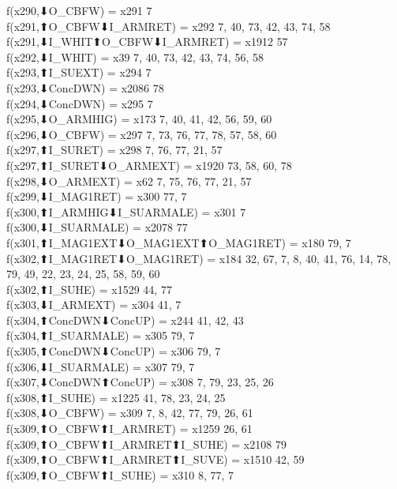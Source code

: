 f(x290,⬇O_CBFW) = x291 {7} \\
f(x291,⬆O_CBFW⬇I_ARMRET) = x292 {7, 40, 73, 42, 43, 74, 58} \\
f(x291,⬇I_WHIT⬆O_CBFW⬇I_ARMRET) = x1912 {57} \\
f(x292,⬇I_WHIT) = x39 {7, 40, 73, 42, 43, 74, 56, 58} \\
f(x293,⬆I_SUEXT) = x294 {7} \\
f(x293,⬇ConcDWN) = x2086 {78} \\
f(x294,⬇ConcDWN) = x295 {7} \\
f(x295,⬇O_ARMHIG) = x173 {7, 40, 41, 42, 56, 59, 60} \\
f(x296,⬇O_CBFW) = x297 {7, 73, 76, 77, 78, 57, 58, 60} \\
f(x297,⬆I_SURET) = x298 {7, 76, 77, 21, 57} \\
f(x297,⬆I_SURET⬇O_ARMEXT) = x1920 {73, 58, 60, 78} \\
f(x298,⬇O_ARMEXT) = x62 {7, 75, 76, 77, 21, 57} \\
f(x299,⬇I_MAG1RET) = x300 {77, 7} \\
f(x300,⬆I_ARMHIG⬇I_SUARMALE) = x301 {7} \\
f(x300,⬇I_SUARMALE) = x2078 {77} \\
f(x301,⬆I_MAG1EXT⬇O_MAG1EXT⬆O_MAG1RET) = x180 {79, 7} \\
f(x302,⬆I_MAG1RET⬇O_MAG1RET) = x184 {32, 67, 7, 8, 40, 41, 76, 14, 78, 79, 49, 22, 23, 24, 25, 58, 59, 60} \\
f(x302,⬆I_SUHE) = x1529 {44, 77} \\
f(x303,⬇I_ARMEXT) = x304 {41, 7} \\
f(x304,⬆ConcDWN⬇ConcUP) = x244 {41, 42, 43} \\
f(x304,⬆I_SUARMALE) = x305 {79, 7} \\
f(x305,⬆ConcDWN⬇ConcUP) = x306 {79, 7} \\
f(x306,⬇I_SUARMALE) = x307 {79, 7} \\
f(x307,⬇ConcDWN⬆ConcUP) = x308 {7, 79, 23, 25, 26} \\
f(x308,⬆I_SUHE) = x1225 {41, 78, 23, 24, 25} \\
f(x308,⬇O_CBFW) = x309 {7, 8, 42, 77, 79, 26, 61} \\
f(x309,⬆O_CBFW⬆I_ARMRET) = x1259 {26, 61} \\
f(x309,⬆O_CBFW⬆I_ARMRET⬆I_SUHE) = x2108 {79} \\
f(x309,⬆O_CBFW⬆I_ARMRET⬆I_SUVE) = x1510 {42, 59} \\
f(x309,⬆O_CBFW⬆I_SUHE) = x310 {8, 77, 7} \\
